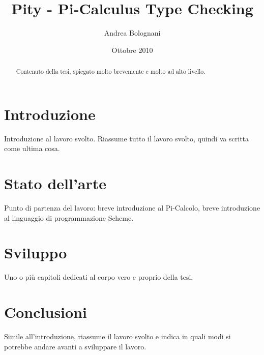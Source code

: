 \documentclass[a4paper,draft]{article}
\begin{document}
\title{Pity - Pi-Calculus Type Checking}
\author{Andrea Bolognani}
\date{Ottobre 2010}

\maketitle


\begin{abstract}
Contenuto della tesi, spiegato molto brevemente e molto ad alto livello.
\end{abstract}


\tableofcontents


\section{Introduzione}

Introduzione al lavoro svolto. Riassume tutto il lavoro svolto, quindi
va scritta come ultima cosa.


\section{Stato dell'arte}

Punto di partenza del lavoro: breve introduzione al Pi-Calcolo, breve
introduzione al linguaggio di programmazione Scheme.


\section{Sviluppo}

Uno o pi\`u capitoli dedicati al corpo vero e proprio della tesi.


\section{Conclusioni}

Simile all'introduzione, riassume il lavoro svolto e indica in quali
modi si potrebbe andare avanti a sviluppare il lavoro.
\end{document}
